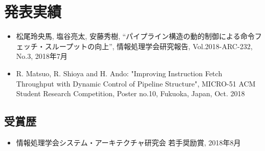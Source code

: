 
\chapter*{発表実績}
\begin{itemize}
  \item 松尾玲央馬, 塩谷亮太, 安藤秀樹, ``パイプライン構造の動的制御による命令フェッチ・スループットの向上'', 情報処理学会研究報告, Vol.2018-ARC-232, No.3, 2018年7月
  \item R. Matsuo, R. Shioya and H. Ando: "Improving Instruction Fetch Throughput with Dynamic Control of Pipeline Structure", MICRO-51 ACM Student Research Competition, Poster no.10, Fukuoka, Japan, Oct. 2018
\end{itemize}

\section*{受賞歴}
\begin{itemize}
  \item 情報処理学会システム・アーキテクチャ研究会 若手奨励賞, 2018年8月
\end{itemize}
